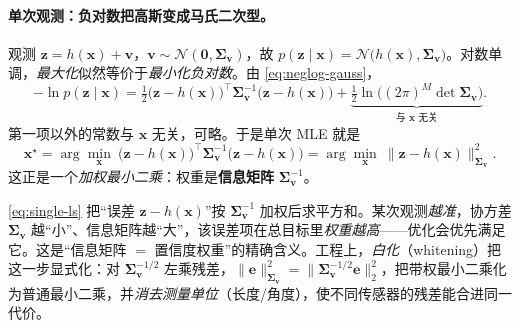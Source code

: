 \paragraph{单次观测：负对数把高斯变成马氏二次型。}
观测 $\mathbf{z}=h(\mathbf{x})+\mathbf{v}$，$\mathbf{v}\sim\mathcal{N}(\mathbf{0},\boldsymbol{\Sigma}_{\mathbf{v}})$，故 $p(\mathbf{z}\mid\mathbf{x})=\mathcal{N}\big(h(\mathbf{x}),\boldsymbol{\Sigma}_{\mathbf{v}}\big)$。对数单调，\emph{最大化}似然等价于\emph{最小化负对数}。由 \cref{eq:neglog-gauss}，
\begin{equation}
  -\ln p(\mathbf{z}\mid\mathbf{x})
  =\tfrac12\big(\mathbf{z}-h(\mathbf{x})\big)^\top\boldsymbol{\Sigma}_{\mathbf{v}}^{-1}\big(\mathbf{z}-h(\mathbf{x})\big)
  +\underbrace{\tfrac12\ln\!\big((2\pi)^M\det\boldsymbol{\Sigma}_{\mathbf{v}}\big)}_{\text{与 }\mathbf{x}\text{ 无关}}.
  \label{eq:neglog}
\end{equation}
第一项以外的常数与 $\mathbf{x}$ 无关，可略。于是单次 MLE 就是
\begin{equation}
  \mathbf{x}^\star=\arg\min_{\mathbf{x}}\ \big(\mathbf{z}-h(\mathbf{x})\big)^\top\boldsymbol{\Sigma}_{\mathbf{v}}^{-1}\big(\mathbf{z}-h(\mathbf{x})\big)
  =\arg\min_{\mathbf{x}}\ \|\mathbf{z}-h(\mathbf{x})\|_{\boldsymbol{\Sigma}_{\mathbf{v}}}^2.
  \label{eq:single-ls}
\end{equation}
这正是一个\emph{加权最小二乘}：权重是\textbf{信息矩阵} $\boldsymbol{\Sigma}_{\mathbf{v}}^{-1}$。

\begin{insight}[信息矩阵即权重]
\cref{eq:single-ls} 把“误差 $\mathbf{z}-h(\mathbf{x})$”按 $\boldsymbol{\Sigma}_{\mathbf{v}}^{-1}$ 加权后求平方和。某次观测\emph{越准}，协方差 $\boldsymbol{\Sigma}_{\mathbf{v}}$ 越“小”、信息矩阵越“大”，该误差项在总目标里\emph{权重越高}——优化会优先满足它。这是“信息矩阵 $=$ 置信度权重”的精确含义。工程上，\emph{白化}（whitening）把这一步显式化：对 $\boldsymbol{\Sigma}_{\mathbf{v}}^{-1/2}$ 左乘残差，$\|\mathbf{e}\|_{\boldsymbol{\Sigma}_{\mathbf{v}}}^2=\|\boldsymbol{\Sigma}_{\mathbf{v}}^{-1/2}\mathbf{e}\|_2^2$\cite{carlone2026handbook}，把带权最小二乘化为普通最小二乘，并\emph{消去测量单位}（长度/角度），使不同传感器的残差能合进同一代价。
\end{insight}

